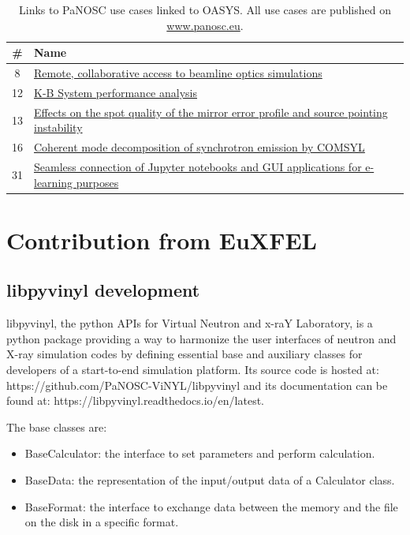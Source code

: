 \documentclass[11pt, a4paper]{article}
\begin{document}
\begin{table}[h!!!]
\centering
\begin{tabular}{c l}
\# & Name \\\hline
8 & \href{https://www.panosc.eu/use-cases/use-case-8-remote-collaborative-access-to-beamline-optics-simulations/}{Remote, collaborative access to beamline optics simulations} \\
12 & \href{https://www.panosc.eu/use-cases/panosc-use-case-12-k-b-system-performance-analysis/}{K-B System performance analysis} \\
13 & \href{https://www.panosc.eu/use-cases/panosc-use-case-13-effects-on-the-spot-quality-of-mirror-error-profile-and-source-pointing-instability/}{Effects on the spot quality of the mirror error profile and source pointing instability} \\
16 & \href{https://www.panosc.eu/use-cases/panosc-use-case-16-coherent-mode-decomposition-of-synchrotron-emission-by-comsyl/}{Coherent mode decomposition of synchrotron emission by COMSYL} \\
31 & \href{https://www.panosc.eu/use-cases/use-case-31-seamless-connection-of-jupyter-notebooks-and-gui-applications-for-e-learning-purposes/}{Seamless connection of Jupyter notebooks and GUI applications for e-learning purposes}
\end{tabular}
\caption{\label{tab:use_cases} Links to PaNOSC use cases linked to OASYS. All use cases are published on \url{www.panosc.eu}.}
\end{table}

\section{Contribution from EuXFEL}

\subsection{libpyvinyl development}
libpyvinyl, the python APIs for Virtual Neutron and x-raY Laboratory, is a python package providing a way to harmonize the user interfaces of neutron and X-ray simulation codes by defining essential base and auxiliary classes for developers of a start-to-end simulation platform. Its source code is hosted at: https://github.com/PaNOSC-ViNYL/libpyvinyl and its documentation can be found at: https://libpyvinyl.readthedocs.io/en/latest.

The base classes are:
\begin{itemize}
    \item BaseCalculator: the interface to set parameters and perform calculation.
    \item BaseData: the representation of the input/output data of a Calculator class.
    \item BaseFormat: the interface to exchange data between the memory and the file on the disk in a specific format.
\end{itemize}
\end{document}
